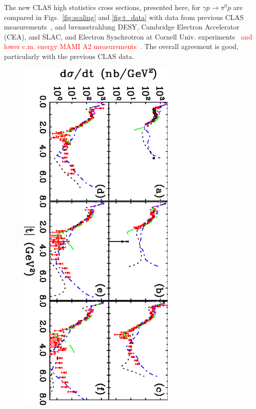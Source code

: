\documentclass[aps,prc,twocolumn,floatfix,showpacs,preprintnumbers,amsmath,amssymb,superscriptaddress,linenumbers]{revtex4-1}
\begin{document}
The new CLAS high statistics cross sections, presented here, for
$\gamma p\rightarrow\pi^0p$ are compared in Figs.~\ref{fig:scaling}
and \ref{fig:t_data} with data from previous CLAS
measurements~\cite{Dugger:2007bt}, and bremsstrahlung DESY, Cambridge
Electron Accelerator (CEA), and SLAC, and Electron Synchrotron at
Cornell Univ. experiments~\cite{brem} \textcolor{red}{and lower c.m. energy MAMI A2 measurements~\protect\cite{Adlarson:2015byy}.} The overall agreement is good,
particularly with the previous CLAS data.
\begin{figure}[htb!]
\centerline{
        \includegraphics[width=3in, angle=90]{dsdt.eps}}


\end{figure}
\end{document}
